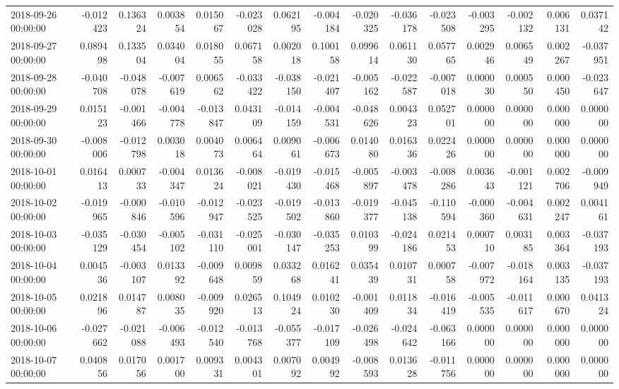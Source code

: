 \begin{tabular}{lrrrrrrrrrrrrrr}
2018-09-26 00:00:00 & -0.012423 & 0.136324 & 0.003854 & 0.015067 & -0.023028 & 0.062195 & -0.004184 & -0.020325 & -0.036178 & -0.023508 & -0.003295 & -0.002132 & 0.006131 & 0.037142 \\
2018-09-27 00:00:00 & 0.089498 & 0.133504 & 0.034004 & 0.018055 & 0.067158 & 0.002018 & 0.100158 & 0.099614 & 0.061130 & 0.057765 & 0.002946 & 0.006549 & 0.002267 & -0.037951 \\
2018-09-28 00:00:00 & -0.040708 & -0.048078 & -0.007619 & 0.006562 & -0.033422 & -0.038150 & -0.021407 & -0.005162 & -0.022587 & -0.007018 & 0.000030 & 0.000550 & 0.000450 & -0.023647 \\
2018-09-29 00:00:00 & 0.015123 & -0.001466 & -0.004778 & -0.013847 & 0.043109 & -0.014159 & -0.004531 & -0.048626 & 0.004323 & 0.052701 & 0.000000 & 0.000000 & 0.000000 & 0.000000 \\
2018-09-30 00:00:00 & -0.008006 & -0.012798 & 0.003018 & 0.004073 & 0.006464 & 0.009061 & -0.006673 & 0.014080 & 0.016336 & 0.022426 & 0.000000 & 0.000000 & 0.000000 & 0.000000 \\
2018-10-01 00:00:00 & 0.016413 & 0.000733 & -0.004347 & 0.013624 & -0.008021 & -0.019430 & -0.015468 & -0.005897 & -0.003478 & -0.008286 & 0.003643 & -0.001121 & 0.002706 & -0.009949 \\
2018-10-02 00:00:00 & -0.019965 & -0.000846 & -0.010596 & -0.012947 & -0.023525 & -0.019502 & -0.013860 & -0.019377 & -0.045138 & -0.110594 & -0.000360 & -0.004631 & 0.002247 & 0.004161 \\
2018-10-03 00:00:00 & -0.035129 & -0.030454 & -0.005102 & -0.031110 & -0.025001 & -0.030147 & -0.035253 & 0.010399 & -0.024186 & 0.021453 & 0.000710 & 0.003185 & 0.003364 & -0.037193 \\
2018-10-04 00:00:00 & 0.004536 & -0.003107 & 0.013392 & -0.009648 & 0.009859 & 0.033268 & 0.016241 & 0.035439 & 0.010731 & 0.000758 & -0.007972 & -0.018164 & 0.003135 & -0.037193 \\
2018-10-05 00:00:00 & 0.021896 & 0.014787 & 0.008035 & -0.009920 & 0.026513 & 0.104924 & 0.010230 & -0.001409 & 0.011834 & -0.016419 & -0.005535 & -0.011617 & 0.000670 & 0.041324 \\
2018-10-06 00:00:00 & -0.027662 & -0.021088 & -0.006493 & -0.012540 & -0.013768 & -0.055377 & -0.017109 & -0.026498 & -0.024642 & -0.063166 & 0.000000 & 0.000000 & 0.000000 & 0.000000 \\
2018-10-07 00:00:00 & 0.040856 & 0.017056 & 0.001700 & 0.009331 & 0.004301 & 0.007092 & 0.004992 & -0.008593 & 0.013628 & -0.011756 & 0.000000 & 0.000000 & 0.000000 & 0.000000 \\

\end{tabular}
